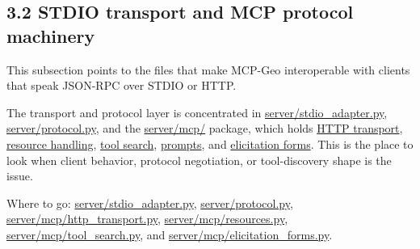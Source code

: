 \subsection{3.2 STDIO transport and MCP protocol
machinery}\label{stdio-transport-and-mcp-protocol-machinery}

This subsection points to the files that make MCP-Geo interoperable with
clients that speak JSON-RPC over STDIO or HTTP.

The transport and protocol layer is concentrated in
\href{https://github.com/chris-page-gov/mcp-geo/blob/fe862910da246ca77f374cfbe484985f5df4d316/server/stdio_adapter.py\#L1-L260}{server/stdio\_adapter.py},
\href{https://github.com/chris-page-gov/mcp-geo/blob/fe862910da246ca77f374cfbe484985f5df4d316/server/protocol.py}{server/protocol.py},
and the
\href{https://github.com/chris-page-gov/mcp-geo/tree/fe862910da246ca77f374cfbe484985f5df4d316/server/mcp}{server/mcp/}
package, which holds
\href{https://github.com/chris-page-gov/mcp-geo/blob/fe862910da246ca77f374cfbe484985f5df4d316/server/mcp/http_transport.py}{HTTP
transport},
\href{https://github.com/chris-page-gov/mcp-geo/blob/fe862910da246ca77f374cfbe484985f5df4d316/server/mcp/resources.py}{resource
handling},
\href{https://github.com/chris-page-gov/mcp-geo/blob/fe862910da246ca77f374cfbe484985f5df4d316/server/mcp/tool_search.py}{tool
search},
\href{https://github.com/chris-page-gov/mcp-geo/blob/fe862910da246ca77f374cfbe484985f5df4d316/server/mcp/prompts.py}{prompts},
and
\href{https://github.com/chris-page-gov/mcp-geo/blob/fe862910da246ca77f374cfbe484985f5df4d316/server/mcp/elicitation_forms.py}{elicitation
forms}. This is the place to look when client behavior, protocol
negotiation, or tool-discovery shape is the issue.

Where to go:
\href{https://github.com/chris-page-gov/mcp-geo/blob/fe862910da246ca77f374cfbe484985f5df4d316/server/stdio_adapter.py\#L1-L260}{server/stdio\_adapter.py},
\href{https://github.com/chris-page-gov/mcp-geo/blob/fe862910da246ca77f374cfbe484985f5df4d316/server/protocol.py}{server/protocol.py},
\href{https://github.com/chris-page-gov/mcp-geo/blob/fe862910da246ca77f374cfbe484985f5df4d316/server/mcp/http_transport.py}{server/mcp/http\_transport.py},
\href{https://github.com/chris-page-gov/mcp-geo/blob/fe862910da246ca77f374cfbe484985f5df4d316/server/mcp/resources.py}{server/mcp/resources.py},
\href{https://github.com/chris-page-gov/mcp-geo/blob/fe862910da246ca77f374cfbe484985f5df4d316/server/mcp/tool_search.py}{server/mcp/tool\_search.py},
and
\href{https://github.com/chris-page-gov/mcp-geo/blob/fe862910da246ca77f374cfbe484985f5df4d316/server/mcp/elicitation_forms.py}{server/mcp/elicitation\_forms.py}.

